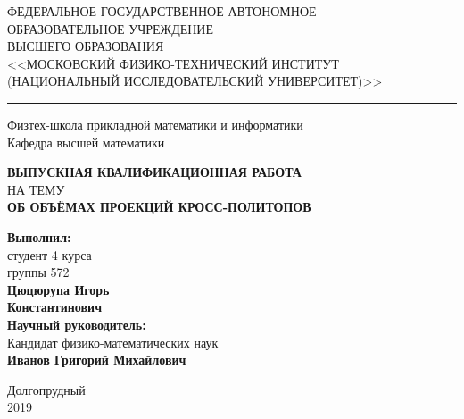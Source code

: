 \documentclass[a4paper]{article}
\newcommand{\HRule}{\rule{\linewidth}{0.5mm}}
\begin{document}
\pagestyle{empty}

	\begin{center}
		ФЕДЕРАЛЬНОЕ ГОСУДАРСТВЕННОЕ АВТОНОМНОЕ\\
		ОБРАЗОВАТЕЛЬНОЕ УЧРЕЖДЕНИЕ\\
		ВЫСШЕГО ОБРАЗОВАНИЯ\\
		<<МОСКОВСКИЙ ФИЗИКО-ТЕХНИЧЕСКИЙ ИНСТИТУТ\\
		(НАЦИОНАЛЬНЫЙ ИССЛЕДОВАТЕЛЬСКИЙ УНИВЕРСИТЕТ)>>\\
	\end{center}
	\HRule
	\begin{center}
		Физтех-школа прикладной математики и информатики\\
		Кафедра высшей математики
	\end{center}
	\begin{center}
		\textbf{ВЫПУСКНАЯ КВАЛИФИКАЦИОННАЯ РАБОТА}\\
		НА ТЕМУ\\
		\textbf{ОБ ОБЪЁМАХ ПРОЕКЦИЙ КРОСС-ПОЛИТОПОВ}
	\end{center}

	\begin{changemargin}{9.5cm}{1cm} 
		\textbf{Выполнил:}\\
		студент 4 курса\\
		группы 572\\
		\textbf{Цюцюрупа Игорь\\
		Константинович}\\

		\noindent\textbf{Научный руководитель:}\\
		Кандидат физико-математических наук\\
		\textbf{Иванов Григорий Михайлович}
	\end{changemargin}

	\vspace{1.5cm}
	\begin{center}
		Долгопрудный\\
		2019
	\end{center}
\end{document}
